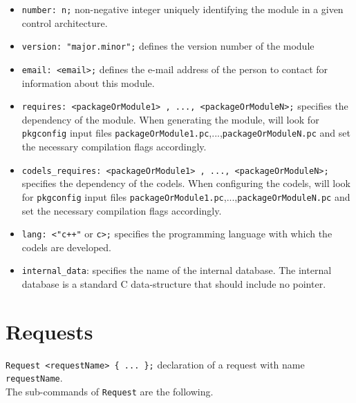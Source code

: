 \begin{itemize}
\item[]{\tt number:  n;} non-negative integer uniquely identifying the module in
a given control architecture.

\item[]\texttt{version:  "major.minor";} defines the version number of the 
module

\item[]\texttt{email:  <email>;} defines the e-mail address of
the person to contact for information about this module.

\item[]\texttt{requires:  <packageOrModule1> , ..., <packageOrModuleN>;}
specifies the dependency of the module. When generating the module,
{\GenoM} will look for \texttt{pkgconfig} input files
\texttt{packageOrModule1.pc},...,\texttt{packageOrModuleN.pc} and set
the necessary compilation flags accordingly. 

\item[]\texttt{codels\_requires:  <packageOrModule1> , ..., <packageOrModuleN>;}
specifies the dependency of the codels. When configuring the codels,
{\GenoM} will look for \texttt{pkgconfig} input files
\texttt{packageOrModule1.pc},...,\texttt{packageOrModuleN.pc} and set
the necessary compilation flags accordingly. 

\item[]\texttt{lang:  <"c++"} or \texttt{c>;} specifies the programming
language with which the codels are developed.

\item[]{\tt internal\_data}: specifies the name of the internal database.
The internal database is a standard C data-structure that should
include no pointer.
\end{itemize}

\section{Requests}
\label{sec|requests}

{\tt Request <requestName> \{ ... \};} declaration of a request with
name {\tt requestName}.\\

\noindent
The sub-commands of {\tt Request} are the following.\\

